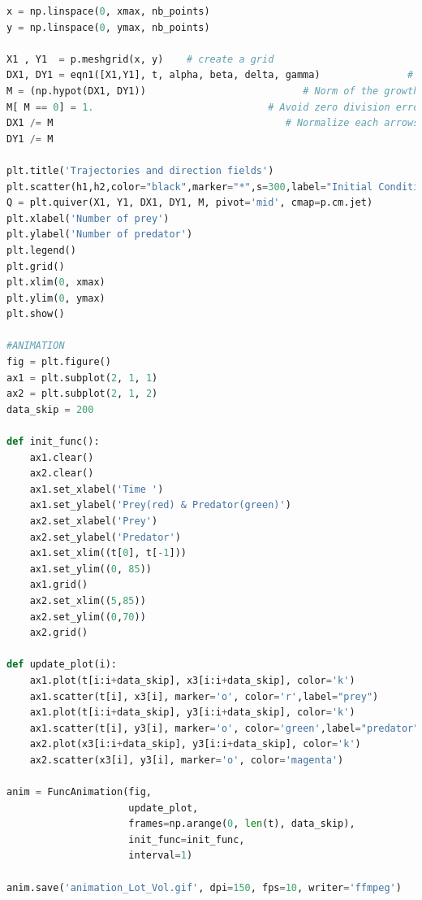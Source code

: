 \documentclass[12pt]{article}
\begin{document}
\begin{lstlisting}[language=Python, caption=Python example]
x = np.linspace(0, xmax, nb_points)
y = np.linspace(0, ymax, nb_points)

X1 , Y1  = p.meshgrid(x, y)    # create a grid     
DX1, DY1 = eqn1([X1,Y1], t, alpha, beta, delta, gamma)               # compute growth rate on the grid
M = (np.hypot(DX1, DY1))                           # Norm of the growth rate 
M[ M == 0] = 1.                              # Avoid zero division errors 
DX1 /= M                                        # Normalize each arrows
DY1 /= M

plt.title('Trajectories and direction fields')
plt.scatter(h1,h2,color="black",marker="*",s=300,label="Initial Conditions")
Q = plt.quiver(X1, Y1, DX1, DY1, M, pivot='mid', cmap=p.cm.jet)
plt.xlabel('Number of prey')
plt.ylabel('Number of predator')
plt.legend()
plt.grid()
plt.xlim(0, xmax)
plt.ylim(0, ymax)
plt.show()

#ANIMATION
fig = plt.figure()
ax1 = plt.subplot(2, 1, 1)
ax2 = plt.subplot(2, 1, 2)
data_skip = 200

def init_func():
    ax1.clear()
    ax2.clear()
    ax1.set_xlabel('Time ')
    ax1.set_ylabel('Prey(red) & Predator(green)')
    ax2.set_xlabel('Prey')
    ax2.set_ylabel('Predator')
    ax1.set_xlim((t[0], t[-1]))
    ax1.set_ylim((0, 85))
    ax1.grid()
    ax2.set_xlim((5,85))
    ax2.set_ylim((0,70))
    ax2.grid()

def update_plot(i):
    ax1.plot(t[i:i+data_skip], x3[i:i+data_skip], color='k')
    ax1.scatter(t[i], x3[i], marker='o', color='r',label="prey")
    ax1.plot(t[i:i+data_skip], y3[i:i+data_skip], color='k')
    ax1.scatter(t[i], y3[i], marker='o', color='green',label="predator")
    ax2.plot(x3[i:i+data_skip], y3[i:i+data_skip], color='k')
    ax2.scatter(x3[i], y3[i], marker='o', color='magenta')

anim = FuncAnimation(fig,
                     update_plot,
                     frames=np.arange(0, len(t), data_skip),
                     init_func=init_func,
                     interval=1)

anim.save('animation_Lot_Vol.gif', dpi=150, fps=10, writer='ffmpeg')


\end{lstlisting}
\newpage
\end{document}
